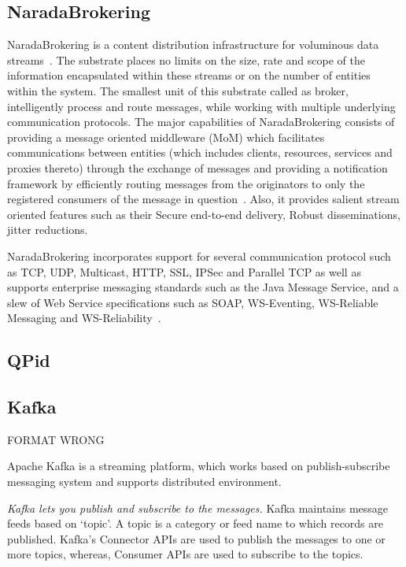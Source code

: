         \pv

\subsection{NaradaBrokering}

NaradaBrokering is a content distribution infrastructure for
voluminous data streams~\cite{www-narada}.  The substrate places no
limits on the size, rate and scope of the information encapsulated
within these streams or on the number of entities within the
system. The smallest unit of this substrate called as broker,
intelligently process and route messages, while working with multiple
underlying communication protocols. The major capabilities of
NaradaBrokering consists of providing a message oriented middleware
(MoM) which facilitates communications between entities (which
includes clients, resources, services and proxies thereto) through the
exchange of messages and providing a notification framework by
efficiently routing messages from the originators to only the
registered consumers of the message in
question~\cite{paper-nb-sustrate}. Also, it provides salient stream
oriented features such as their Secure end-to-end delivery, Robust
disseminations, jitter reductions.

NaradaBrokering incorporates support for several communication
protocol such as TCP, UDP, Multicast, HTTP, SSL, IPSec and Parallel
TCP as well as supports enterprise messaging standards such as the
Java Message Service, and a slew of Web Service specifications such as
SOAP, WS-Eventing, WS-Reliable Messaging and
WS-Reliability~\cite{www-narada-features}.

     \pv

     
\subsection{QPid}

\pv

\subsection{Kafka}

     FORMAT WRONG 

     Apache Kafka is a streaming platform, which works based on
     publish-subscribe messaging system and supports distributed
     environment.
      
     \textit{Kafka lets you publish and subscribe to the messages.} Kafka
     maintains message feeds based on ‘topic’. A topic is a category
     or feed name to which records are published. Kafka’s Connector
     APIs are used to publish the messages to one or more topics,
     whereas, Consumer APIs are used to subscribe to the topics.


